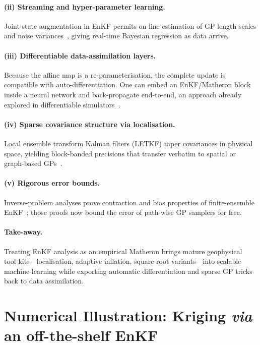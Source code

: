 \documentclass[wcp]{jmlr} %
\begin{document}
\paragraph{(ii) Streaming and hyper-parameter learning.}
Joint-state augmentation in EnKF permits on-line estimation of GP length-scales and noise variances~\citep{Kuzin2018GPEnKF}, giving real-time Bayesian regression as data arrive.

\paragraph{(iii) Differentiable data-assimilation layers.}
Because the affine map is a re-parameterisation, the complete update is compatible with auto-differentiation.  One can embed an EnKF/Matheron block inside a neural network and back-propagate end-to-end, an approach already explored in differentiable simulators~\citep{Spantini2022Coupling,Schillings2016EnKFInverse}.

\paragraph{(iv) Sparse covariance structure via localisation.}
Local ensemble transform Kalman filters (LETKF) taper covariances in physical space, yielding block-banded precisions that transfer verbatim to spatial or graph-based GPs~\citep{Hunt2007LETKF}.

\paragraph{(v) Rigorous error bounds.}
Inverse-problem analyses prove contraction and bias properties of finite-ensemble EnKF~\citep{Schillings2016EnKFInverse}; those proofs now bound the error of path-wise GP samplers for free.

\paragraph{Take-away.}
Treating EnKF analysis as an empirical Matheron  brings mature geophysical tool-kits—localisation, adaptive inflation, square-root variants—into scalable machine-learning while exporting automatic differentiation and sparse GP tricks back to data assimilation.

\section{Numerical Illustration:  Kriging \emph{via} an off-the-shelf EnKF}
\label{sec:numerical-demo}
\end{document}
